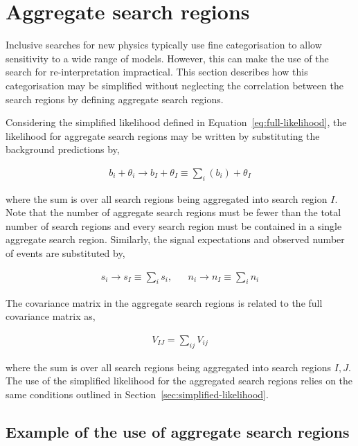 \section{Aggregate search regions}
\label{sec:aggregate-signal-regions}

Inclusive searches for new physics typically use fine categorisation to allow
sensitivity to a wide range of models. However, this can make the use
of the search for re-interpretation impractical. 
This section describes how this categorisation may be simplified without neglecting the correlation 
between the search regions by defining aggregate search regions.

Considering the simplified likelihood defined in Equation~\ref{eq:full-likelihood},
the likelihood for aggregate search regions may be written by substituting the 
background predictions by,

\begin{align}
b_{i} + \theta_i \rightarrow b_I + \theta_I \equiv \sum_{i}(b_{i}) + \theta_I
\label{eq:b-agg}
\end{align}

where the sum is over all search regions being aggregated into search region $I$.
Note that the number of aggregate search regions must be fewer than the total number of search regions and 
every search region must be contained in a single aggregate search region. 
Similarly, the signal expectations and observed number of events are substituted by, 

\begin{align}
 s_{i}  \rightarrow s_{I} \equiv \sum_{i}s_{i},  &&  n_{i}  \rightarrow n_{I} \equiv \sum_{i}n_{i} 
\label{eq:b-agg}
\end{align}


The covariance matrix in the aggregate search regions is related to the full covariance matrix as, 

\begin{align}
V_{IJ}=\sum_{ij}V_{ij}
\label{eq:agg-cov}
\end{align}

where the sum is over all search regions being aggregated into search regions $I,J$.  The use of the simplified likelihood 
for the aggregated search regions relies on the same conditions outlined in Section~\ref{sec:simplified-likelihood}. 

\subsection{Example of the use of aggregate search regions}
\label{sec:agg-toy}

